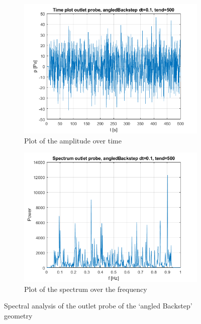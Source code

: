 \documentclass[fleqn,12pt]{NTFD} %
\begin{document}
\begin{figure}[H]
\centering
\begin{subfigure}{.5\textwidth}
  \centering
  \includegraphics[width=.8\linewidth]{angledbackstep_time_outlet.png}
  \caption{Plot of the amplitude over time}
  \label{fig:sub1}
\end{subfigure}%
\begin{subfigure}{.5\textwidth}
  \centering
  \includegraphics[width=.8\linewidth]{angledbackstep_spectrum_outlet.png}
  \caption{Plot of the spectrum over the frequency}
  \label{fig:sub2}
\end{subfigure}
\caption{Spectral analysis of the outlet probe of the `angled Backstep' geometry}
\label{fig:test}
\end{figure}
\end{document}
